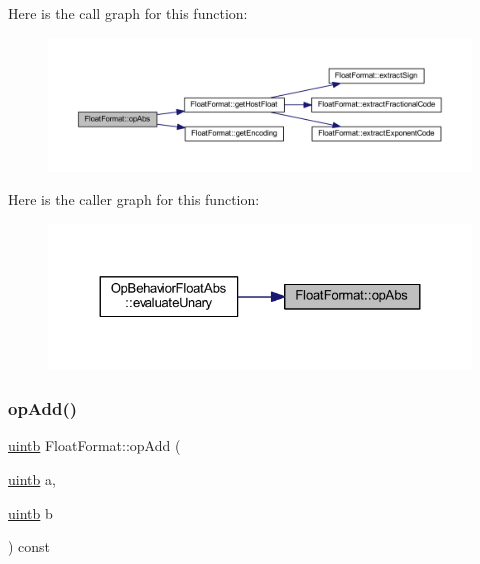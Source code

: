 Here is the call graph for this function\+:
\nopagebreak
\begin{figure}[H]
\begin{center}
\leavevmode
\includegraphics[width=350pt]{class_float_format_a5edfc9c055efded2f22bb42a91058164_cgraph}
\end{center}
\end{figure}
Here is the caller graph for this function\+:
\nopagebreak
\begin{figure}[H]
\begin{center}
\leavevmode
\includegraphics[width=324pt]{class_float_format_a5edfc9c055efded2f22bb42a91058164_icgraph}
\end{center}
\end{figure}
\mbox{\label{class_float_format_ad342814d842cb20b16dbe4fc9af59e1e}} 
\subsubsection{\texorpdfstring{opAdd()}{opAdd()}}
{\footnotesize\ttfamily \mbox{\hyperlink{types_8h_a2db313c5d32a12b01d26ac9b3bca178f}{uintb}} Float\+Format\+::op\+Add (\begin{DoxyParamCaption}\item[{\mbox{\hyperlink{types_8h_a2db313c5d32a12b01d26ac9b3bca178f}{uintb}}}]{a,  }\item[{\mbox{\hyperlink{types_8h_a2db313c5d32a12b01d26ac9b3bca178f}{uintb}}}]{b }\end{DoxyParamCaption}) const}




